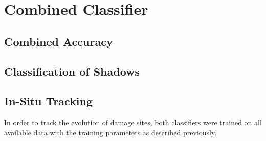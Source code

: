 

\section{Combined Classifier}

\subsection{Combined Accuracy}

\subsection{Classification of Shadows}


\subsection{In-Situ Tracking}
In order to track the evolution of damage sites, both classifiers were trained on all available data with the training parameters as described previously. \\

